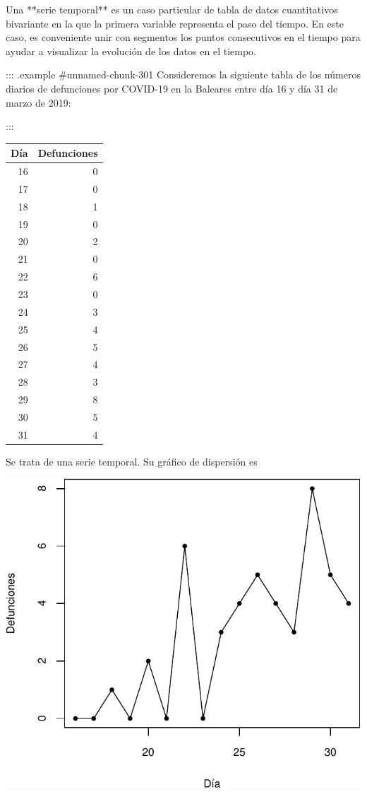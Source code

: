 \documentclass[
]{book}
\theoremstyle{definition}
\theoremstyle{definition}
\theoremstyle{definition}
\theoremstyle{definition}
\theoremstyle{remark}
\begin{document}
Una **serie temporal** es un caso particular de tabla de datos cuantitativos bivariante en la que la primera variable representa el paso del tiempo. En este caso, es conveniente unir con segmentos los puntos consecutivos en el tiempo para ayudar a visualizar la evolución de los datos en el tiempo.

::: {.example #unnamed-chunk-301}
Consideremos la siguiente tabla de los números diarios de defunciones por COVID-19 en la Baleares entre día 16 y día 31 de marzo de 2019:

   
:::

\begin{table}
\centering
\begin{tabular}{r|r}
\hline
Día & Defunciones\\
\hline
16 & 0\\
\hline
17 & 0\\
\hline
18 & 1\\
\hline
19 & 0\\
\hline
20 & 2\\
\hline
21 & 0\\
\hline
22 & 6\\
\hline
23 & 0\\
\hline
24 & 3\\
\hline
25 & 4\\
\hline
26 & 5\\
\hline
27 & 4\\
\hline
28 & 3\\
\hline
29 & 8\\
\hline
30 & 5\\
\hline
31 & 4\\
\hline
\end{tabular}
\end{table}

Se trata de una serie temporal. Su gráfico de dispersión es

\begin{center}\includegraphics[width=0.5\linewidth]{INREMDN_files/figure-latex/unnamed-chunk-303-1} \end{center}
\end{document}
